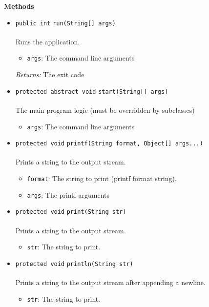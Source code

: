 \textbf{\sffamily Methods}
\begin{itemize}
\item \lstinline|public int| \lstinline|run|\lstinline|(String[] args)|\\ \\[-0.6em]
Runs the application.
\begin{itemize}
\item \lstinline|args|: The command line arguments
\end{itemize}

\emph{Returns:} The exit code

\item \lstinline|protected abstract void| \lstinline|start|\lstinline|(String[] args)|\\ \\[-0.6em]
The main program logic (must be overridden by subclasses)
\begin{itemize}
\item \lstinline|args|: The command line arguments
\end{itemize}



\item \lstinline|protected void| \lstinline|printf|\lstinline|(String format, Object[] args...)|\\ \\[-0.6em]
Prints a string to the output stream.
\begin{itemize}
\item \lstinline|format|: The string to print (printf format string).
\item \lstinline|args|: The printf arguments
\end{itemize}



\item \lstinline|protected void| \lstinline|print|\lstinline|(String str)|\\ \\[-0.6em]
Prints a string to the output stream.
\begin{itemize}
\item \lstinline|str|: The string to print.
\end{itemize}



\item \lstinline|protected void| \lstinline|println|\lstinline|(String str)|\\ \\[-0.6em]
Prints a string to the output stream after appending a newline.
\begin{itemize}
\item \lstinline|str|: The string to print.
\end{itemize}




\end{itemize}
